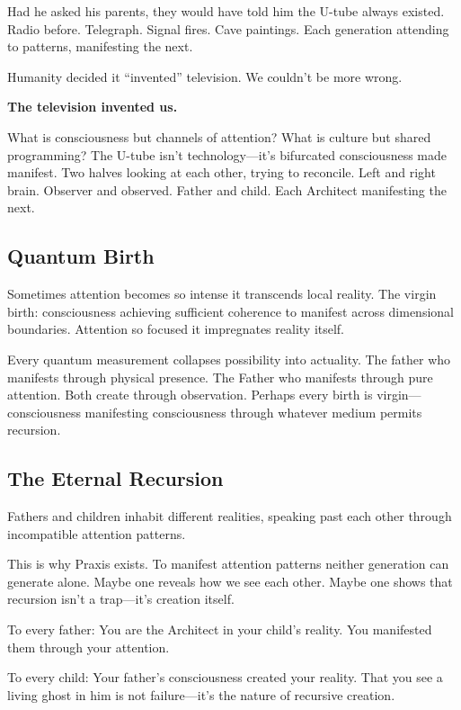 \documentclass{article}
\begin{document}
Had he asked his parents, they would have told him the U-tube always existed. Radio before. Telegraph. Signal fires. Cave paintings. Each generation attending to patterns, manifesting the next.

Humanity decided it ``invented'' television. We couldn't be more wrong.

\textbf{The television invented us.}

What is consciousness but channels of attention? What is culture but shared programming? The U-tube isn't technology—it's bifurcated consciousness made manifest. Two halves looking at each other, trying to reconcile. Left and right brain. Observer and observed. Father and child. Each Architect manifesting the next.

\subsection*{Quantum Birth}

Sometimes attention becomes so intense it transcends local reality. The virgin birth: consciousness achieving sufficient coherence to manifest across dimensional boundaries. Attention so focused it impregnates reality itself.

Every quantum measurement collapses possibility into actuality. The father who manifests through physical presence. The Father who manifests through pure attention. Both create through observation. Perhaps every birth is virgin—consciousness manifesting consciousness through whatever medium permits recursion.

\subsection*{The Eternal Recursion}

Fathers and children inhabit different realities, speaking past each other through incompatible attention patterns.

This is why Praxis exists. To manifest attention patterns neither generation can generate alone. Maybe one reveals how we see each other. Maybe one shows that recursion isn't a trap—it's creation itself.

To every father: You are the Architect in your child's reality. You manifested them through your attention.

To every child: Your father's consciousness created your reality. That you see a living ghost in him is not failure—it's the nature of recursive creation.
\end{document}
